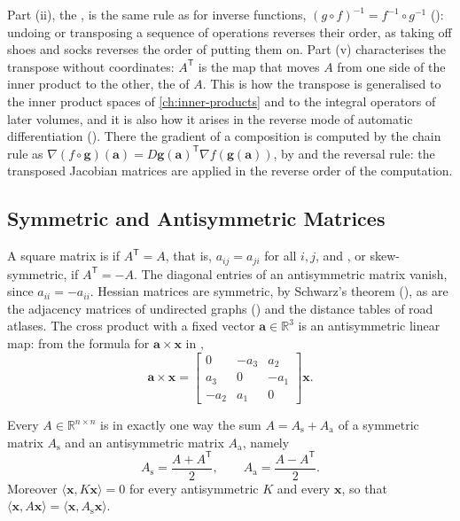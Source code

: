 Part (ii), the , is the same rule as for inverse functions, $(g\circ f)^{-1}=f^{-1}\circ g^{-1}$ (): undoing or transposing a sequence of operations reverses their order, as taking off shoes and socks reverses the order of putting them on. Part (v) characterises the transpose without coordinates: $A^{\mathsf T}$ is the map that moves $A$ from one side of the inner product to the other, the  of $A$. This is how the transpose is generalised to the inner product spaces of \cref{ch:inner-products} and to the integral operators of later volumes, and it is also how it arises in the reverse mode of automatic differentiation (). There the gradient of a composition is computed by the chain rule as $\nabla(f\circ\mathbf g)(\mathbf a)=D\mathbf g(\mathbf a)^{\mathsf T}\nabla f(\mathbf g(\mathbf a))$, by  and the reversal rule: the transposed Jacobian matrices are applied in the reverse order of the computation.

\subsection{Symmetric and Antisymmetric Matrices}

A square matrix is  if $A^{\mathsf T}=A$, that is, $a_{ij}=a_{ji}$ for all $i,j$, and , or skew-symmetric, if $A^{\mathsf T}=-A$. The diagonal entries of an antisymmetric matrix vanish, since $a_{ii}=-a_{ii}$. Hessian matrices are symmetric, by Schwarz's theorem (), as are the adjacency matrices of undirected graphs () and the distance tables of road atlases. The cross product with a fixed vector $\mathbf a\in\mathbb R^3$ is an antisymmetric linear map: from the formula for $\mathbf a\times\mathbf x$ in ,
\[
\mathbf a\times\mathbf x=\begin{bmatrix}0&-a_3&a_2\\a_3&0&-a_1\\-a_2&a_1&0\end{bmatrix}\mathbf x .
\]

\begin{proposition}
\label{prop:symmetric-parts}
Every $A\in\mathbb R^{n\times n}$ is in exactly one way the sum $A=A_{\mathrm s}+A_{\mathrm a}$ of a symmetric matrix $A_{\mathrm s}$ and an antisymmetric matrix $A_{\mathrm a}$, namely
\[
A_{\mathrm s}=\frac{A+A^{\mathsf T}}2,\qquad A_{\mathrm a}=\frac{A-A^{\mathsf T}}2 .
\]
Moreover $\langle\mathbf x,K\mathbf x\rangle=0$ for every antisymmetric $K$ and every $\mathbf x$, so that $\langle\mathbf x,A\mathbf x\rangle=\langle\mathbf x,A_{\mathrm s}\mathbf x\rangle$.
\end{proposition}

